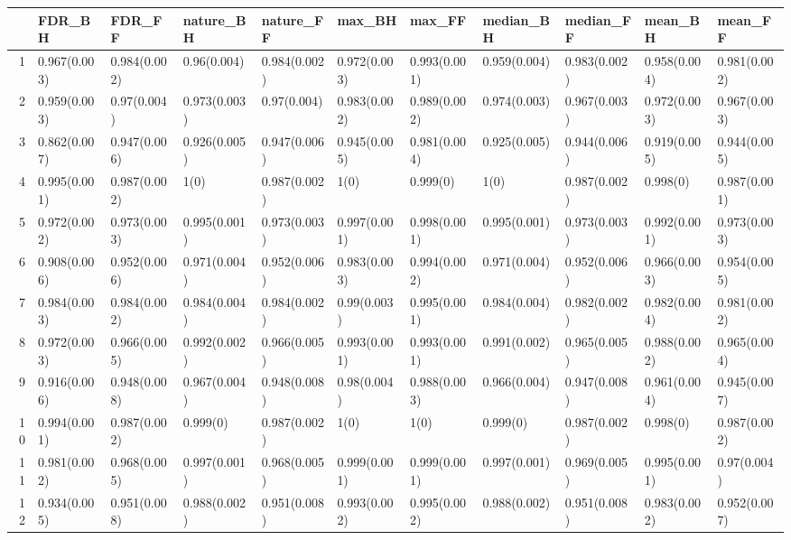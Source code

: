 \begin{table}[ht]
\centering
\begin{tabular}{rllllllllll}
  \hline
 & FDR\_BH & FDR\_FF & nature\_BH & nature\_FF & max\_BH & max\_FF & median\_BH & median\_FF & mean\_BH & mean\_FF \\ 
  \hline
1 & 0.967(0.003) & 0.984(0.002) & 0.96(0.004) & 0.984(0.002) & 0.972(0.003) & 0.993(0.001) & 0.959(0.004) & 0.983(0.002) & 0.958(0.004) & 0.981(0.002) \\ 
  2 & 0.959(0.003) & 0.97(0.004) & 0.973(0.003) & 0.97(0.004) & 0.983(0.002) & 0.989(0.002) & 0.974(0.003) & 0.967(0.003) & 0.972(0.003) & 0.967(0.003) \\ 
  3 & 0.862(0.007) & 0.947(0.006) & 0.926(0.005) & 0.947(0.006) & 0.945(0.005) & 0.981(0.004) & 0.925(0.005) & 0.944(0.006) & 0.919(0.005) & 0.944(0.005) \\ 
  4 & 0.995(0.001) & 0.987(0.002) & 1(0) & 0.987(0.002) & 1(0) & 0.999(0) & 1(0) & 0.987(0.002) & 0.998(0) & 0.987(0.001) \\ 
  5 & 0.972(0.002) & 0.973(0.003) & 0.995(0.001) & 0.973(0.003) & 0.997(0.001) & 0.998(0.001) & 0.995(0.001) & 0.973(0.003) & 0.992(0.001) & 0.973(0.003) \\ 
  6 & 0.908(0.006) & 0.952(0.006) & 0.971(0.004) & 0.952(0.006) & 0.983(0.003) & 0.994(0.002) & 0.971(0.004) & 0.952(0.006) & 0.966(0.003) & 0.954(0.005) \\ 
  7 & 0.984(0.003) & 0.984(0.002) & 0.984(0.004) & 0.984(0.002) & 0.99(0.003) & 0.995(0.001) & 0.984(0.004) & 0.982(0.002) & 0.982(0.004) & 0.981(0.002) \\ 
  8 & 0.972(0.003) & 0.966(0.005) & 0.992(0.002) & 0.966(0.005) & 0.993(0.001) & 0.993(0.001) & 0.991(0.002) & 0.965(0.005) & 0.988(0.002) & 0.965(0.004) \\ 
  9 & 0.916(0.006) & 0.948(0.008) & 0.967(0.004) & 0.948(0.008) & 0.98(0.004) & 0.988(0.003) & 0.966(0.004) & 0.947(0.008) & 0.961(0.004) & 0.945(0.007) \\ 
  10 & 0.994(0.001) & 0.987(0.002) & 0.999(0) & 0.987(0.002) & 1(0) & 1(0) & 0.999(0) & 0.987(0.002) & 0.998(0) & 0.987(0.002) \\ 
  11 & 0.981(0.002) & 0.968(0.005) & 0.997(0.001) & 0.968(0.005) & 0.999(0.001) & 0.999(0.001) & 0.997(0.001) & 0.969(0.005) & 0.995(0.001) & 0.97(0.004) \\ 
  12 & 0.934(0.005) & 0.951(0.008) & 0.988(0.002) & 0.951(0.008) & 0.993(0.002) & 0.995(0.002) & 0.988(0.002) & 0.951(0.008) & 0.983(0.002) & 0.952(0.007) \\ 
   \hline
\end{tabular}
\end{table}
